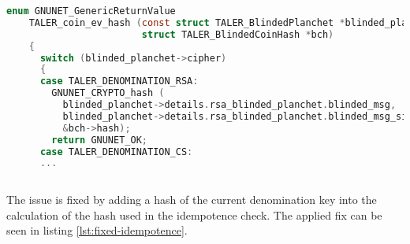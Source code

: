 \begin{lstlisting}[style=bfh-c,language=C, caption={Idempotency check on RSA}, label={lst:rsa-idempotence}]
    enum GNUNET_GenericReturnValue
    TALER_coin_ev_hash (const struct TALER_BlindedPlanchet *blinded_planchet,
                        struct TALER_BlindedCoinHash *bch)
    {
      switch (blinded_planchet->cipher)
      {
      case TALER_DENOMINATION_RSA:
        GNUNET_CRYPTO_hash (
          blinded_planchet->details.rsa_blinded_planchet.blinded_msg,
          blinded_planchet->details.rsa_blinded_planchet.blinded_msg_size,
          &bch->hash);
        return GNUNET_OK;
      case TALER_DENOMINATION_CS:
      ...
    
\end{lstlisting}

The issue is fixed by adding a hash of the current denomination key into the calculation of the hash used in the \gls{idempotence} check.
The applied fix can be seen in listing \ref{lst:fixed-idempotence}.

